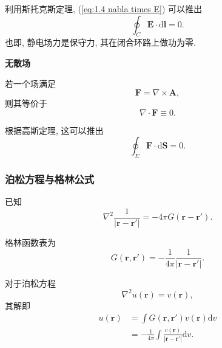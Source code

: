 利用斯托克斯定理, (\ref{eq:1.4 nabla times E}) 可以推出
\begin{equation}
    \oint_C\bm{E}\cdot\mathrm{d}\bm{l}=0.
\end{equation}
也即, 静电场力是保守力, 其在闭合环路上做功为零.

\textbf{无散场}

若一个场满足
\begin{equation}
    \bm{F}=\nabla\times\bm{A},
\end{equation}
则其等价于
\begin{equation}
    \nabla\cdot\bm{F}\equiv 0.
\end{equation}

根据高斯定理, 这可以推出
\begin{equation}
    \oint_\Sigma\bm{F}\cdot\mathrm{d}\bm{S}=0.
\end{equation}

\subsubsection{泊松方程与格林公式}
已知
\begin{equation} \label{eq:1.4 nabla 2 r r'}
    \nabla^2\frac{1}{|\bm{r}-\bm{r}'|}=-4\pi G(\bm{r}-\bm{r}').
\end{equation}

格林函数表为
\begin{equation}
    G(\bm{r},\bm{r}')=-\frac{1}{4\pi}\frac{1}{|\bm{r}-\bm{r}'|}.
\end{equation}

对于泊松方程
\begin{equation}
    \nabla^2 u(\bm{r})=v(\bm{r}),
\end{equation}
其解即
\begin{equation}
    \begin{aligned}
        u(\bm{r}) & =\int G(\bm{r},\bm{r}')v(\bm{r})\mathrm{d}v                        \\
                  & =-\frac{1}{4\pi}\int\frac{v(\bm{r})}{|\bm{r}-\bm{r}'|}\mathrm{d}v.
    \end{aligned}
\end{equation}
